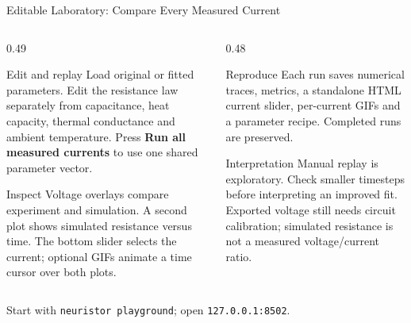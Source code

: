 \begin{frame}{Editable Laboratory: Compare Every Measured Current}
\begin{columns}[T,onlytextwidth]
\begin{column}{0.49\textwidth}
\begin{block}{Edit and replay}
\small Load original or fitted parameters. Edit the resistance law separately
from capacitance, heat capacity, thermal conductance and ambient temperature.
Press \textbf{Run all measured currents} to use one shared parameter vector.
\end{block}
\begin{block}{Inspect}
\small Voltage overlays compare experiment and simulation. A second plot shows
simulated resistance versus time. The bottom slider selects the current;
optional GIFs animate a time cursor over both plots.
\end{block}
\end{column}
\begin{column}{0.48\textwidth}
\begin{block}{Reproduce}
\small Each run saves numerical traces, metrics, a standalone HTML current
slider, per-current GIFs and a parameter recipe. Completed runs are preserved.
\end{block}
\begin{alertblock}{Interpretation}
\small Manual replay is exploratory. Check smaller timesteps before interpreting
an improved fit. Exported voltage still needs circuit calibration; simulated
resistance is not a measured voltage/current ratio.
\end{alertblock}
\end{column}
\end{columns}
\vspace{0.2cm}
\small Start with \texttt{neuristor playground}; open \texttt{127.0.0.1:8502}.
\end{frame}
